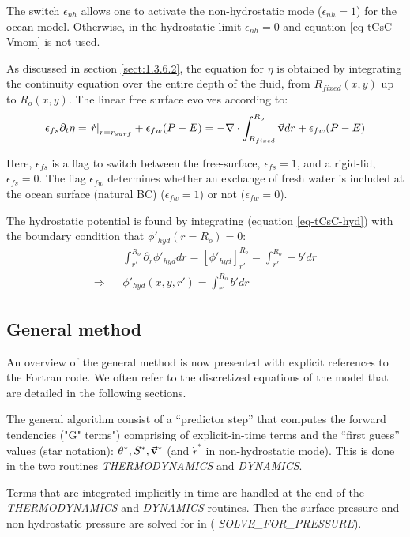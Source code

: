 The switch $\epsilon_{nh}$ allows one to activate the non-hydrostatic
mode ($\epsilon_{nh}=1$) for the ocean model. Otherwise, in the
hydrostatic limit $\epsilon_{nh} = 0$ and equation \ref{eq-tCsC-Vmom}
is not used.

As discussed in section \ref{sect:1.3.6.2}, the equation for $\eta$ is
obtained by integrating the continuity equation over the entire depth
of the fluid, from $R_{fixed}(x,y)$ up to $R_o(x,y)$. The linear free
surface evolves according to:
\begin{eqnarray}
\epsilon_{fs} \partial_t \eta =
\left. \dot{r} \right|_{r=r_{surf}} + \epsilon_{fw} (P-E) =
- {\bf \nabla} \cdot \int_{R_{fixed}}^{R_o} \vec{\bf v} dr
+ \epsilon_{fw} (P-E)
\label{eq-tCsC-eta}
\end{eqnarray}

Here, $\epsilon_{fs}$ is a flag to switch between the free-surface,
$\epsilon_{fs}=1$, and a rigid-lid, $\epsilon_{fs}=0$. The flag
$\epsilon_{fw}$ determines whether an exchange of fresh water is
included at the ocean surface (natural BC) ($\epsilon_{fw} = 1$) or
not ($\epsilon_{fw} = 0$).

The hydrostatic potential is found by integrating (equation
\ref{eq-tCsC-hyd}) with the boundary condition that
$\phi'_{hyd}(r=R_o) = 0$:
\begin{eqnarray*}
& &
\int_{r'}^{R_o} \partial_r \phi'_{hyd} dr =
\left[ \phi'_{hyd} \right]_{r'}^{R_o} =
\int_{r'}^{R_o} - b' dr
\\
\Rightarrow & &
\phi'_{hyd}(x,y,r') = \int_{r'}^{R_o} b' dr
\end{eqnarray*}

\subsection{General method}
 
An overview of the general method is now presented with explicit
references to the Fortran code. We often refer to the discretized
equations of the model that are detailed in the following sections.

The general algorithm consist of a ``predictor step'' that computes
the forward tendencies ("G" terms") comprising of explicit-in-time
terms and the ``first guess'' values (star notation): $\theta^*, S^*,
\vec{\bf v}^*$ (and $\dot{r}^*$ in non-hydrostatic mode). This is done
in the two routines {\it THERMODYNAMICS} and {\it DYNAMICS}.

Terms that are integrated implicitly in time are handled at the end of
the {\it THERMODYNAMICS} and {\it DYNAMICS} routines. Then the
surface pressure and non hydrostatic pressure are solved for in ({\it
SOLVE\_FOR\_PRESSURE}).

